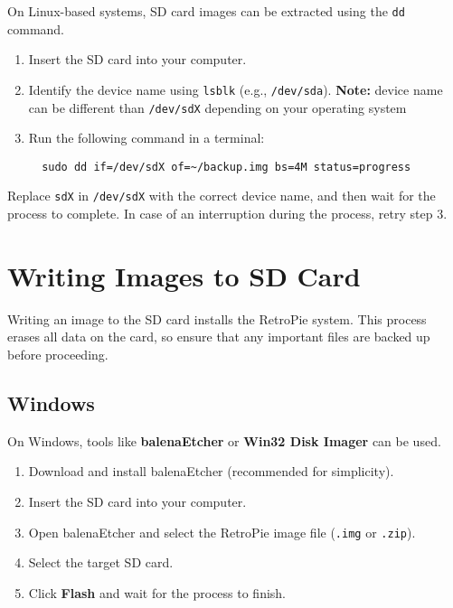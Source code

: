 On Linux-based systems, SD card images can be extracted using the \texttt{dd} command.  
\begin{enumerate}
  \item Insert the SD card into your computer.  
  \item Identify the device name using \texttt{lsblk} (e.g., \texttt{/dev/sda}). \textbf{Note:} device name can be different than \texttt{/dev/sdX} depending on your operating system  
  \item Run the following command in a terminal:  
  \begin{verbatim}
  sudo dd if=/dev/sdX of=~/backup.img bs=4M status=progress
  \end{verbatim}  
\end{enumerate}

Replace \texttt{sdX} in \texttt{/dev/sdX} with the correct device name, and then wait for the process to complete. In case of an interruption during the process, retry step 3.  

\section{Writing Images to SD Card}
\label{sec:writing_images_sd_card}

Writing an image to the SD card installs the RetroPie system. This process erases all data on the card, so ensure that any important files are backed up before proceeding.  

\subsection{Windows}
\label{subsec:writing_windows}

On Windows, tools like \textbf{balenaEtcher} or \textbf{Win32 Disk Imager} can be used.  
\begin{enumerate}
  \item Download and install balenaEtcher (recommended for simplicity).  
  \item Insert the SD card into your computer.  
  \item Open balenaEtcher and select the RetroPie image file (\texttt{.img} or \texttt{.zip}).  
  \item Select the target SD card.  
  \item Click \textbf{Flash} and wait for the process to finish.  
\end{enumerate}

